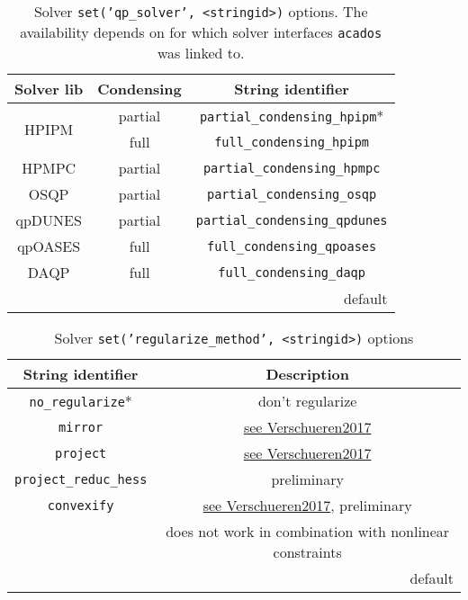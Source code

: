 \documentclass[english]{article}
\newcommand{\code}[1]{\texttt{#1}}
\newcommand{\str}[1]{\texttt{'#1'}}
\newcommand{\acados}{\texttt{acados}}
\begin{document}
%
\begin{table}
    \centering
    \caption{Solver \code{set(\str{qp\_solver}, <stringid>)} options. The availability depends on for which solver interfaces \acados{} was linked to.}\label{tab:solver_options:qp_solver_option}
    \begin{tabular}{c@{ }c@{}c}
        \toprule
        Solver lib & Condensing & {String identifier} \\ \midrule
        \multirow{2}{1.2cm}{\centering HPIPM} & partial & \code{partial\_condensing\_hpipm}*\\
         & full & \code{full\_condensing\_hpipm} \\%
        HPMPC & partial & \code{partial\_condensing\_hpmpc} \\%
        OSQP & partial & \code{partial\_condensing\_osqp} \\
        qpDUNES & partial & \code{partial\_condensing\_qpdunes} \\
        qpOASES & full & \code{full\_condensing\_qpoases} \\
        DAQP & full & \code{full\_condensing\_daqp} \\
        \bottomrule
        \multicolumn{3}{r}{\footnotesize * default}
    \end{tabular}
\end{table}
%
\begin{table}
    \centering
    \caption{Solver \code{set(\str{regularize\_method}, <stringid>)} options}
    \label{tab:solver_options:regularize_method}
    \begin{tabular}{cc}
        \toprule
        String identifier & Description \\\midrule
        \code{no\_regularize}* & don't regularize \\
        \code{mirror} & \href{https://cdn.syscop.de/publications/Verschueren2017.pdf}{see Verschueren2017} \\
        \code{project} & \href{https://cdn.syscop.de/publications/Verschueren2017.pdf}{see Verschueren2017} \\
        \code{project\_reduc\_hess} & preliminary \\
        \code{convexify} & \href{https://cdn.syscop.de/publications/Verschueren2017.pdf}{see Verschueren2017}, preliminary \\
        &does not work in combination with nonlinear constraints \\
        \bottomrule
        \multicolumn{2}{r}{\footnotesize * default}
    \end{tabular}
\end{table}
\end{document}
